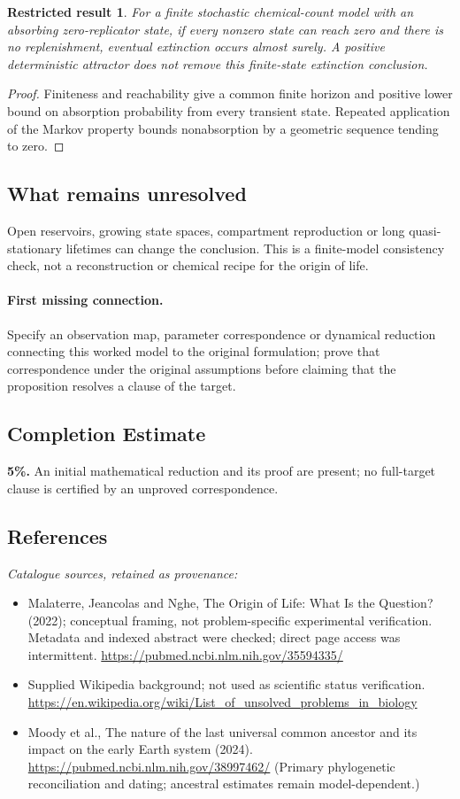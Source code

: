 \documentclass[11pt]{article}
\newtheorem{attemptresult}{Restricted result}[section]
\begin{document}
\begin{attemptresult}
For a finite stochastic chemical-count model with an absorbing zero-replicator state, if every nonzero state can reach zero and there is no replenishment, eventual extinction occurs almost surely. A positive deterministic attractor does not remove this finite-state extinction conclusion.
\end{attemptresult}
\begin{proof}
Finiteness and reachability give a common finite horizon and positive lower bound on absorption probability from every transient state. Repeated application of the Markov property bounds nonabsorption by a geometric sequence tending to zero.
\end{proof}
\subsection{What remains unresolved}
Open reservoirs, growing state spaces, compartment reproduction or long quasi-stationary lifetimes can change the conclusion. This is a finite-model consistency check, not a reconstruction or chemical recipe for the origin of life.
\paragraph{First missing connection.} Specify an observation map, parameter correspondence or dynamical reduction connecting this worked model to the original formulation; prove that correspondence under the original assumptions before claiming that the proposition resolves a clause of the target.
\subsection{Completion Estimate}
\textbf{5\%.} An initial mathematical reduction and its proof are present; no full-target clause is certified by an unproved correspondence.
\subsection{References}
\noindent\emph{Catalogue sources, retained as provenance:}
\begin{itemize}
\item Malaterre, Jeancolas and Nghe, The Origin of Life: What Is the Question? (2022); conceptual framing, not problem-specific experimental verification. Metadata and indexed abstract were checked; direct page access was intermittent. \url{https://pubmed.ncbi.nlm.nih.gov/35594335/}
\item Supplied Wikipedia background; not used as scientific status verification. \url{https://en.wikipedia.org/wiki/List_of_unsolved_problems_in_biology}
\item Moody et al., The nature of the last universal common ancestor and its impact on the early Earth system (2024). \url{https://pubmed.ncbi.nlm.nih.gov/38997462/} (Primary phylogenetic reconciliation and dating; ancestral estimates remain model-dependent.)
\end{itemize}
\clearpage
\end{document}
